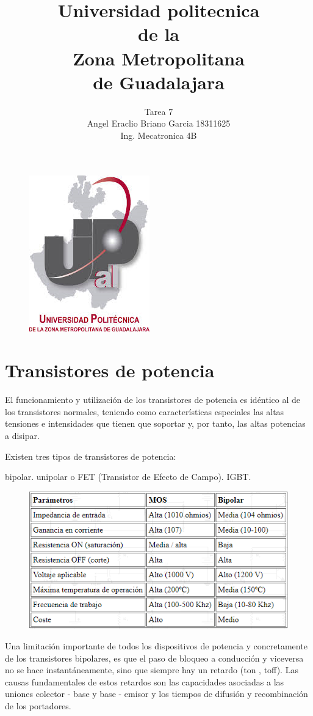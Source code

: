 \documentclass[12pt,a4paper]{article}
\begin{document}
\title{Universidad politecnica\\ de la \\ Zona Metropolitana\\ de Guadalajara}
\author{Tarea 7\\ Angel Eraclio Briano Garcia 18311625\\ Ing. Mecatronica 4B}
\maketitle
\begin{figure}[h!]
\centering
\includegraphics[scale=1]{untitled.png} 
\end{figure}
\newpage
\section{Transistores de potencia}
El funcionamiento y utilización de los transistores de potencia es idéntico al de los transistores normales, teniendo como características especiales las altas tensiones e intensidades que tienen que soportar y, por tanto, las altas potencias a disipar.

Existen tres tipos de transistores de potencia:

bipolar.
unipolar o FET (Transistor de Efecto de Campo).
IGBT.
\begin{figure}[h!]
\centering
\includegraphics[scale=1]{Matriz.PNG} 
\end{figure}
Una limitación importante de todos los dispositivos de potencia y concretamente de los transistores bipolares, es que el paso de bloqueo a conducción y viceversa no se hace instantáneamente, sino que siempre hay un retardo (ton , toff). Las causas fundamentales de estos retardos son las capacidades asociadas a las uniones colector - base y base - emisor y los tiempos de difusión y recombinación de los portadores.
\end{document}
